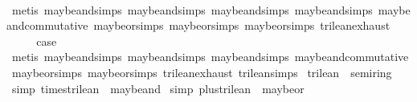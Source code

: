 \begin{isabellebody}
\ \ \ \ \isamarkupfalse%
\ {\isacharparenleft}metis\ maybe{\isacharunderscore}and{\isachardot}simps{\isacharparenleft}{}{\isacharparenright}\ maybe{\isacharunderscore}and{\isachardot}simps{\isacharparenleft}{}{\isacharparenright}\ maybe{\isacharunderscore}and{\isachardot}simps{\isacharparenleft}{}{\isacharparenright}\ maybe{\isacharunderscore}and{\isachardot}simps{\isacharparenleft}{}{\isacharparenright}\ maybe{\isacharunderscore}and{\isacharunderscore}commutative\ maybe{\isacharunderscore}or{\isachardot}simps{\isacharparenleft}{}{\isacharparenright}\ maybe{\isacharunderscore}or{\isachardot}simps{\isacharparenleft}{}{\isacharparenright}\ maybe{\isacharunderscore}or{\isachardot}simps{\isacharparenleft}{}{\isacharparenright}\ trilean{\isachardot}exhaust{\isacharparenright}\isanewline
{}\isamarkupfalse%
\isanewline
{}\isamarkupfalse%
\ {}\isanewline
\ \ \isamarkupfalse%
\ \isamarkupfalse%
\ {\isacharquery}case\isanewline
\ \ \ \ \isamarkupfalse%
\ {\isacharparenleft}metis\ maybe{\isacharunderscore}and{\isachardot}simps{\isacharparenleft}{}{\isacharparenright}\ maybe{\isacharunderscore}and{\isachardot}simps{\isacharparenleft}{}{\isacharparenright}\ maybe{\isacharunderscore}and{\isachardot}simps{\isacharparenleft}{}{\isacharparenright}\ maybe{\isacharunderscore}and{\isacharunderscore}commutative\ maybe{\isacharunderscore}or{\isachardot}simps{\isacharparenleft}{}{\isacharparenright}\ maybe{\isacharunderscore}or{\isachardot}simps{\isacharparenleft}{}{\isacharparenright}\ trilean{\isachardot}exhaust\ trilean{\isachardot}simps{\isacharparenleft}{}{\isacharparenright}{\isacharparenright}\isanewline
{}\isamarkupfalse%
%
\endisatagproof
{\isafoldproof}%
%
\isadelimproof
\isanewline
%
\endisadelimproof
\isanewline
{}\isamarkupfalse%
\ trilean\ {\isacharcolon}{\isacharcolon}\ semiring\ \isanewline
{}\isamarkupfalse%
\ {\isacharbrackleft}simp{\isacharbrackright}{\isacharcolon}\ {\isachardoublequoteopen}times{\isacharunderscore}trilean\ {\isacharequal}\ maybe{\isacharunderscore}and{\isachardoublequoteclose}\isanewline
\isanewline
{}\isamarkupfalse%
\ {\isacharbrackleft}simp{\isacharbrackright}{\isacharcolon}\ {\isachardoublequoteopen}plus{\isacharunderscore}trilean\ {\isacharequal}\ maybe{\isacharunderscore}or{\isachardoublequoteclose}\isanewline

\end{isabellebody}
